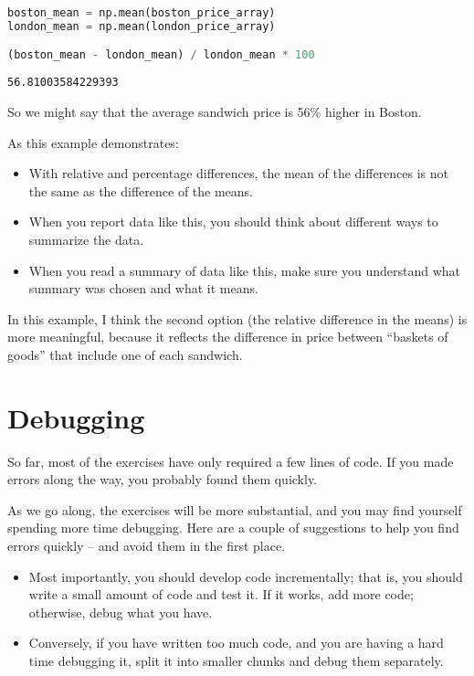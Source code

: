 \begin{lstlisting}[language=Python,style=source]
boston_mean = np.mean(boston_price_array)
london_mean = np.mean(london_price_array)

(boston_mean - london_mean) / london_mean * 100
\end{lstlisting}

\begin{lstlisting}[style=output]
56.81003584229393
\end{lstlisting}

So we might say that the average sandwich price is 56\% higher in
Boston.

As this example demonstrates:

\begin{itemize}
\item
  With relative and percentage differences, the mean of the differences
  is not the same as the difference of the means.
\item
  When you report data like this, you should think about different ways
  to summarize the data.
\item
  When you read a summary of data like this, make sure you understand
  what summary was chosen and what it means.
\end{itemize}

In this example, I think the second option (the relative difference in
the means) is more meaningful, because it reflects the difference in
price between ``baskets of goods'' that include one of each sandwich.

\hypertarget{debugging}{%
\section{Debugging}\label{debugging}}

So far, most of the exercises have only required a few lines of code. If
you made errors along the way, you probably found them quickly.

As we go along, the exercises will be more substantial, and you may find
yourself spending more time debugging. Here are a couple of suggestions
to help you find errors quickly -- and avoid them in the first place.

\begin{itemize}
\item
  Most importantly, you should develop code incrementally; that is, you
  should write a small amount of code and test it. If it works, add more
  code; otherwise, debug what you have.
\item
  Conversely, if you have written too much code, and you are having a
  hard time debugging it, split it into smaller chunks and debug them
  separately.
\end{itemize}

